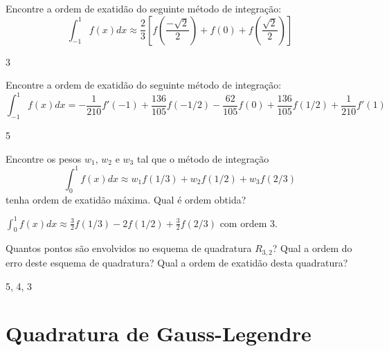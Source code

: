 \begin{Exercise}
Encontre a ordem de exatidão do seguinte método de integração:
$$\int_{-1}^1f(x)dx\approx \frac{2}{3}\left[f\left(\frac{-\sqrt{2}}{2}\right)+f(0)+f\left(\frac{\sqrt{2}}{2}\right)\right]$$
\end{Exercise}
\begin{Answer}
  \begin{tiny}
3    
  \end{tiny}
\end{Answer}


\begin{Exercise}
Encontre a ordem de exatidão do seguinte método de integração:
$$\int_{-1}^1f(x)dx=-\frac{1}{210}f'(-1)+\frac{136}{105} f(-1/2) - \frac{62}{105} f(0) + \frac{136}{105}f(1/2) +\frac{1}{210}f'(1)$$
\end{Exercise}
\begin{Answer}
  \begin{tiny}
5    
  \end{tiny}
\end{Answer}

\begin{Exercise} Encontre os pesos $w_1$, $w_2$ e $w_3$ tal que o método de integração
$$\int_0^1 f(x)dx \approx w_1 f(1/3)  + w_2f(1/2) + w_3f(2/3)$$
tenha ordem de exatidão máxima. Qual é ordem obtida?
\end{Exercise}
\begin{Answer}
  \begin{tiny}
$\int_0^1 f(x)dx \approx \frac{3}{2} f(1/3)  -2f(1/2) + \frac{3}{2}f(2/3)$ com ordem 3.    
  \end{tiny}
\end{Answer}

\begin{Exercise}
Quantos pontos são envolvidos no esquema de quadratura $R_{3,2}$? Qual a ordem do erro deste esquema de quadratura? Qual a ordem de exatidão desta quadratura?
\end{Exercise}
\begin{Answer}
  \begin{tiny}
 5, 4, 3    
  \end{tiny}
\end{Answer}


\section{Quadratura de Gauss-Legendre}

